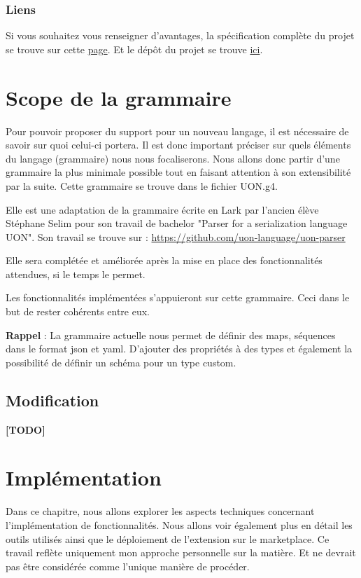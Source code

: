 \documentclass[
    iict, %
    il, %
]{heig-tb}
\begin{document}
\subsection{Liens}
Si vous souhaitez vous renseigner d'avantages, la spécification complète du projet se trouve sur cette \href{https://github.com/uon-language/specification/}{page}.
Et le dépôt du projet se trouve \href{https://github.com/uon-language/specification}{ici}.

\chapter{Scope de la grammaire}\label{grammar scope}
Pour pouvoir proposer du support pour un nouveau langage, il est nécessaire de savoir sur quoi celui-ci portera. Il est donc important préciser sur quels éléments du langage (grammaire) nous nous focaliserons.
Nous allons donc partir d'une grammaire la plus minimale possible tout en faisant attention à son extensibilité par la suite.
Cette grammaire se trouve dans le fichier UON.g4.

Elle est une adaptation de la grammaire écrite en Lark par l'ancien élève Stéphane Selim pour son travail de bachelor "Parser for a serialization language UON". Son travail se trouve sur :
\href{https://github.com/uon-language/uon-parser}{https://github.com/uon-language/uon-parser}

Elle sera complétée et améliorée après la mise en place des fonctionnalités attendues, si le temps le permet.

Les fonctionnalités implémentées s'appuieront sur cette grammaire. Ceci dans le but de rester cohérents entre eux.

\textbf{Rappel} :
La grammaire actuelle nous permet de définir des maps, séquences dans le format json et yaml. D'ajouter des propriétés à des types et également la possibilité de définir un schéma pour un type custom.

\section{Modification}
\textbf{[TODO]}

\chapter{Implémentation}
Dans ce chapitre, nous allons explorer les aspects techniques concernant l'implémentation de fonctionnalités. Nous allons voir également plus en détail les outils utilisés ainsi que le déploiement de l'extension sur le marketplace.
Ce travail reflète uniquement mon approche personnelle sur la matière. Et ne devrait pas être considérée comme l'unique manière de procéder.
\end{document}
